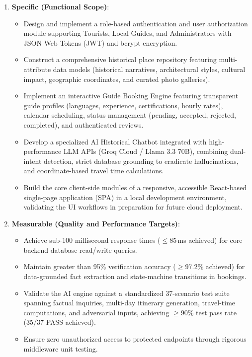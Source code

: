 \documentclass[12pt,a4paper,twoside,openright]{report}
\begin{document}
\begin{enumerate}[leftmargin=*]
    \item \textbf{Specific (Functional Scope)}:
    \begin{itemize}
        \item Design and implement a role-based authentication and user authorization module supporting Tourists, Local Guides, and Administrators with JSON Web Tokens (JWT) and bcrypt encryption.
        \item Construct a comprehensive historical place repository featuring multi-attribute data models (historical narratives, architectural styles, cultural impact, geographic coordinates, and curated photo galleries).
        \item Implement an interactive Guide Booking Engine featuring transparent guide profiles (languages, experience, certifications, hourly rates), calendar scheduling, status management (pending, accepted, rejected, completed), and authenticated reviews.
        \item Develop a specialized AI Historical Chatbot integrated with high-performance LLM APIs (Groq Cloud / Llama 3.3 70B), combining dual-intent detection, strict database grounding to eradicate hallucinations, and coordinate-based travel time calculations.
        \item Build the core client-side modules of a responsive, accessible React-based single-page application (SPA) in a local development environment, validating the UI workflows in preparation for future cloud deployment.
    \end{itemize}

    \item \textbf{Measurable (Quality and Performance Targets)}:
    \begin{itemize}
        \item Achieve sub-100 millisecond response times ($\leq 85$\,ms achieved) for core backend database read/write queries.
        \item Maintain greater than 95\% verification accuracy ($\geq 97.2\%$ achieved) for data-grounded fact extraction and state-machine transitions in bookings.
        \item Validate the AI engine against a standardized 37-scenario test suite spanning factual inquiries, multi-day itinerary generation, travel-time computations, and adversarial inputs, achieving $\geq 90\%$ test pass rate (35/37 PASS achieved).
        \item Ensure zero unauthorized access to protected endpoints through rigorous middleware unit testing.
    \end{itemize}


\end{enumerate}
\end{document}
